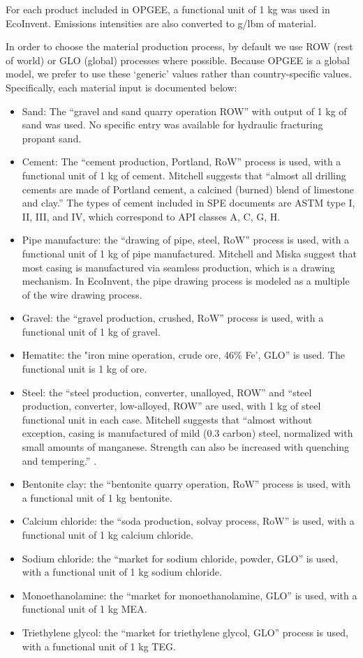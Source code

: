 \documentclass[11pt]{report}
\begin{document}
For each product included in OPGEE, a functional unit of 1 kg was used in EcoInvent. Emissions intensities are also converted to g/lbm of material.

In order to choose the material production process, by default we use ROW (rest of world) or GLO (global) processes where possible. Because OPGEE is a global model, we prefer to use these `generic' values rather than country-specific values. Specifically, each material input is documented below:
\begin{itemize}
\item Sand: The ``gravel and sand quarry operation ROW'' with output of 1 kg of sand was used. No specific entry was available for hydraulic fracturing propant sand.
\item Cement: The ``cement production, Portland, RoW'' process is used, with a functional unit of 1 kg of cement. Mitchell suggests \cite[p. 382]{Mitchell2006} that ``almost all drilling cements are made of Portland cement, a calcined (burned) blend of limestone and clay.'' The types of cement included in SPE documents are ASTM type I, II, III, and IV, which correspond to API classes A, C, G, H.
\item Pipe manufacture: the ``drawing of pipe, steel, RoW'' process is used, with a functional unit of 1 kg of pipe manufactured. Mitchell and Miska \cite[p. 387]{Mitchell2011} suggest that most casing is manufactured via seamless production, which is a drawing mechanism. In EcoInvent, the pipe drawing process is modeled as a multiple of the wire drawing process.
\item Gravel: the ``gravel production, crushed, RoW'' process is used, with a functional unit of 1 kg of gravel.
\item Hematite: the "iron mine operation, crude ore, 46\% Fe', GLO'' is used. The functional unit is 1 kg of ore.
\item Steel: the ``steel production, converter, unalloyed, ROW'' and ``steel production, converter, low-alloyed, ROW'' are used, with 1 kg of steel functional unit in each case. Mitchell suggests that ``almost without exception, casing is manufactured of mild (0.3 carbon) steel, normalized with small amounts of manganese. Strength can also be increased with quenching and tempering.'' \cite[p. 288]{Mitchell2006}.
\item Bentonite clay: the ``bentonite quarry operation, RoW'' process is used, with a functional unit of 1 kg bentonite.
\item Calcium chloride: the ``soda production, solvay process, RoW'' is used, with a functional unit of 1 kg calcium chloride.
\item Sodium chloride: the ``market for sodium chloride, powder, GLO'' is used, with a functional unit of 1 kg sodium chloride.
\item Monoethanolamine: the ``market for monoethanolamine, GLO'' is used, with a functional unit of 1 kg MEA.
\item Triethylene glycol: the ``market for triethylene glycol, GLO'' process is used, with a functional unit of 1 kg TEG.
\end{itemize}
\end{document}
